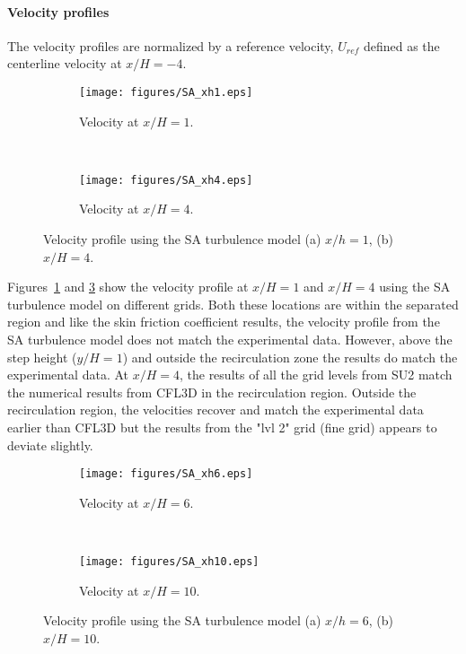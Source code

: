 \paragraph*{Velocity profiles}
The velocity profiles are normalized by a reference velocity, $U_{ref}$ defined as the centerline velocity at $x/H=-4$. 
\begin{figure}[h!]
    \centering
    \captionsetup{justification=centering}
    \begin{subfigure}[b]{0.48\textwidth}
    \captionsetup{justification=centering}
        \texttt{[image: figures/SA\_xh1.eps]}
        \caption{Velocity at $x/H=1$.}
        \label{fig:tbfsax1}
    \end{subfigure}
    ~ %
    \begin{subfigure}[b]{0.48\textwidth}
    \centering
    \captionsetup{justification=centering}
        \texttt{[image: figures/SA\_xh4.eps]}
        \caption{Velocity at $x/H=4$.}
        \label{fig:tbfsax4}
    \end{subfigure}
    \caption{Velocity profile using the SA turbulence model (a) $x/h=1$, (b) $x/H=4$.}
\end{figure}
Figures~\ref{fig:tbfsax1} and \ref{fig:tbfsax4} show the velocity profile at $x/H=1$ and $x/H=4$ using the SA turbulence model on different grids. Both these locations are within the separated region and like the skin friction coefficient results, the velocity profile from the SA turbulence model does not match the experimental data. However, above the step height ($y/H=1$) and outside the recirculation zone the results do match the experimental data. At $x/H=4$, the results of all the grid levels from SU2 match the numerical results from CFL3D in the recirculation region. Outside the recirculation region, the velocities recover and match the experimental data earlier than CFL3D but the results from the "lvl 2" grid (fine grid) appears to deviate slightly.
\begin{figure}[h!]
    \centering
    \captionsetup{justification=centering}
    \begin{subfigure}[b]{0.48\textwidth}
    \captionsetup{justification=centering}
        \texttt{[image: figures/SA\_xh6.eps]}
        \caption{Velocity at $x/H=6$.}
        \label{fig:tbfsax6}
    \end{subfigure}
    ~ %
    \begin{subfigure}[b]{0.48\textwidth}
    \centering
    \captionsetup{justification=centering}
        \texttt{[image: figures/SA\_xh10.eps]}
        \caption{Velocity at $x/H=10$.}
        \label{fig:tbfsax10}
    \end{subfigure}
    \caption{Velocity profile using the SA turbulence model (a) $x/h=6$, (b) $x/H=10$.}
\end{figure}
